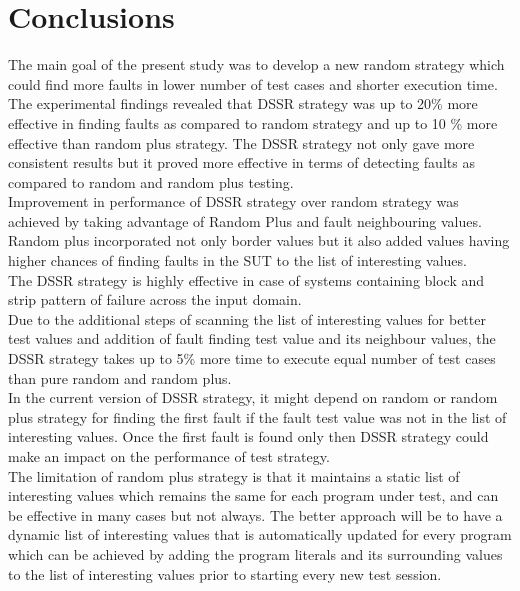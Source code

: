 \documentclass[conference]{IEEEtran}
\begin{document}
\section{Conclusions}\label{sec:conc}
The main goal of the present study was to develop a new random strategy which could find more faults in lower number of test cases and shorter execution time. The experimental findings revealed that DSSR strategy was up to 20\% more effective in finding faults as compared to random strategy and up to 10 \% more effective than random plus strategy. The DSSR strategy not only gave more consistent results but it proved more effective in terms of detecting faults as compared to random and random plus testing.\\
\indent Improvement in performance of DSSR strategy over random strategy was achieved by taking advantage of Random Plus and fault neighbouring values. Random plus incorporated not only border values but it also added values having higher chances of finding faults in the SUT to the list of interesting values.\\
\indent The DSSR strategy is highly effective in case of systems containing block and strip pattern of failure across the input domain.\\
\indent Due to the additional steps of scanning the list of interesting values for better test values and addition of fault finding test value and its neighbour values, the DSSR strategy takes up to 5\% more time to execute equal number of test cases than pure random and random plus. \\
\indent In the current version of DSSR strategy, it might depend on random or random plus strategy for finding the first fault if the fault test value was not in the list of interesting values. Once the first fault is found only then DSSR strategy could make an impact on the performance of test strategy.\\
\indent The limitation of random plus strategy is that it maintains a static list of interesting values which remains the same for each program under test, and can be effective in many cases but not always. The better approach will be to have a dynamic list of interesting values that is automatically updated for every program which can be achieved by adding the program literals and its surrounding values to the list of interesting values prior to starting every new test session.


\end{document}
